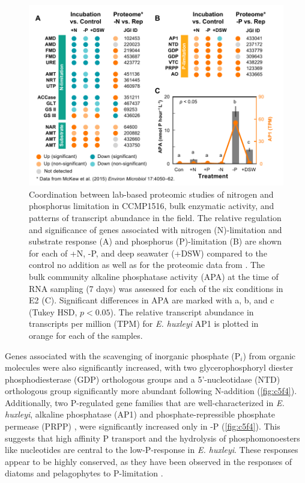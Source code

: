 \begin{figure}[h!]
  \centering
    \includegraphics[width=1\textwidth]{Images/C5_Figure5_McKewComparison_v2.pdf}
    \caption[Coordination between lab-based proteomic studies of nitrogen and phosphorus limitation in CCMP1516, bulk enzymatic activity, and patterns of transcript abundance in the field]{Coordination between lab-based proteomic studies of nitrogen and phosphorus limitation in CCMP1516, bulk enzymatic activity, and patterns of transcript abundance in the field. The relative regulation and significance of genes associated with nitrogen (N)-limitation and substrate response (A) and phosphorus (P)-limitation (B) are shown for each of +N, -P, and deep seawater (+DSW) compared to the control no addition as well as for the proteomic data from \citet{McKew2015}.  The bulk community alkaline phosphatase activity (APA) at the time of RNA sampling (7 days) was assessed for each of the six conditions in E2 (C). Significant differences in APA are marked with a, b, and c (Tukey HSD, $p < 0.05$). The relative transcript abundance in transcripts per million (TPM) for \textit{E. huxleyi} AP1 is plotted in orange for each of the samples. }
  \label{fig:c5f5}
\end{figure}

Genes associated with the scavenging of inorganic phosphate (P$_i$) from organic molecules were also significantly increased, with two glycerophosphoryl diester phosphodiesterase (GDP) orthologous groups and a 5'-nucleotidase (NTD) orthologous group significantly more abundant following N-addition (\cref{fig:c5f4}). Additionally, two P-regulated gene families that are well-characterized in \textit{E. huxleyi}, alkaline phosphatase (AP1) \citep{Xu2006} and phosphate-repressible phosphate permease (PRPP) \citep{Chung2003, Dyhrman2003, Dyhrman2006}, were significantly increased only in -P (\cref{fig:c5f4}). This suggests that high affinity P transport and the hydrolysis of phosphomonoesters like nucleotides are central to the low-P-response in \textit{E. huxleyi}. These responses appear to be highly conserved, as they have been observed in the responses of diatoms and pelagophytes to P-limitation  \citep{Wurch2011a, Dyhrman2012}.



